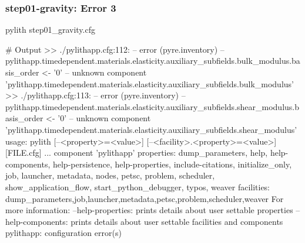 \documentclass[aspectratio=169]{beamer}
\begin{document}
\begin{frame}[fragile]
  \frametitle{{\ttfamily step01-gravity}: Error 3}

\begin{pyrejournal}
pylith step01_gravity.cfg

# Output
 >> ./pylithapp.cfg:112:
 -- error (pyre.inventory)
 -- pylithapp.timedependent.materials.elasticity.auxiliary_subfields.bulk_modulus.basis_order <- '0'
 -- unknown component 'pylithapp.timedependent.materials.elasticity.auxiliary_subfields.bulk_modulus'
 >> ./pylithapp.cfg:113:
 -- error (pyre.inventory)
 -- pylithapp.timedependent.materials.elasticity.auxiliary_subfields.shear_modulus.basis_order <- '0'
 -- unknown component 'pylithapp.timedependent.materials.elasticity.auxiliary_subfields.shear_modulus'
usage: pylith [--<property>=<value>] [--<facility>.<property>=<value>] [FILE.cfg] ...
component 'pylithapp'
    properties: dump_parameters, help, help-components, help-persistence, help-properties, include-citations, initialize_only, job, launcher, metadata, nodes, petsc, problem, scheduler, show_application_flow, start_python_debugger, typos, weaver
    facilities: dump_parameters,job,launcher,metadata,petsc,problem,scheduler,weaver
For more information:
  --help-properties: prints details about user settable properties
  --help-components: prints details about user settable facilities and components
pylithapp: configuration error(s)
\end{pyrejournal}

\end{frame}
\end{document}
